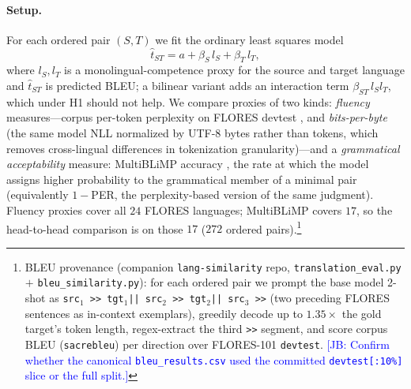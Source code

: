 \documentclass[11pt]{article}
\newcommand{\jb}[1]{\textcolor{blue}{[JB: #1]}} %
\begin{document}
\paragraph{Setup.} For each ordered pair $(S,T)$ we fit the ordinary least
squares model
\begin{equation}
\hat{t}_{ST} = a + \beta_S\, l_S + \beta_T\, l_T,
\label{eq:linear}
\end{equation}
where $l_S, l_T$ is a monolingual-competence proxy for the source and target
language and $\hat t_{ST}$ is predicted BLEU; a bilinear variant adds an
interaction term $\beta_{ST}\, l_S l_T$, which under H1 should not help. We
compare proxies of two kinds: \emph{fluency} measures---corpus per-token
perplexity on FLORES devtest \citep{goyal2022flores}, and \emph{bits-per-byte}
(the same model NLL normalized by UTF-8 bytes rather than tokens, which removes
cross-lingual differences in tokenization granularity)---and a \emph{grammatical
acceptability} measure: MultiBLiMP accuracy \citep{jumelet2025multiblimp}, the
rate at which the model assigns higher probability to the grammatical member of
a minimal pair (equivalently $1-$PER, the perplexity-based version of the same
judgment). Fluency proxies cover all $24$ FLORES languages; MultiBLiMP covers
$17$, so the head-to-head comparison is on those $17$ ($272$ ordered
pairs).\footnote{BLEU provenance (companion \texttt{lang-similarity} repo,
\texttt{translation\_eval.py} $+$ \texttt{bleu\_similarity.py}): for each ordered
pair we prompt the base model 2-shot as \texttt{src$_1$ >> tgt$_1$|| src$_2$ >>
tgt$_2$|| src$_3$ >>} (two preceding FLORES sentences as in-context exemplars),
greedily decode up to $1.35\times$ the gold target's token length,
regex-extract the third \texttt{>>} segment, and score corpus BLEU
(\texttt{sacrebleu}) per direction over FLORES-101 \texttt{devtest}.
\jb{Confirm whether the canonical \texttt{bleu\_results.csv} used the committed
\texttt{devtest[:10\%]} slice or the full split.}}
\end{document}
